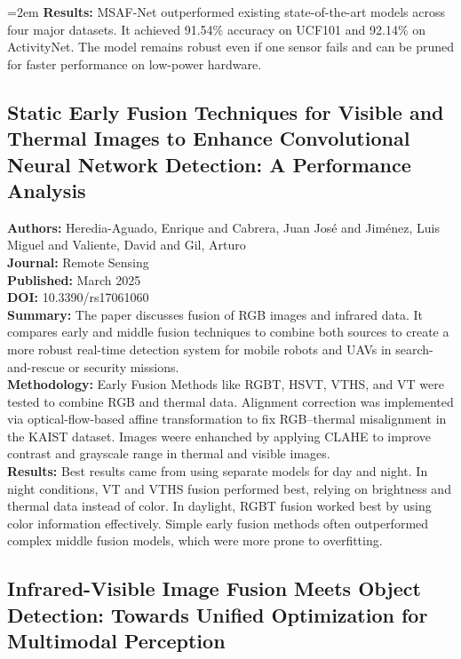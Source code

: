 \begingroup\emergencystretch=2em
  \textbf{Results:} MSAF-Net outperformed existing state-of-the-art models across four major
  datasets. It achieved 91.54\% accuracy on UCF101 and 92.14\% on ActivityNet. The model remains
  robust even if one sensor fails and can be pruned for faster performance on low-power hardware.
\par\endgroup

\subsection{Static Early Fusion Techniques for Visible and Thermal Images to Enhance Convolutional
  Neural Network Detection: A Performance Analysis}
\textbf{Authors:} Heredia-Aguado, Enrique and Cabrera, Juan José and Jiménez, Luis Miguel and
Valiente, David and Gil, Arturo \\
\textbf{Journal:} Remote Sensing \\
\textbf{Published:} March 2025 \\
\textbf{DOI:} 10.3390/rs17061060 \\

\textbf{Summary:} The paper discusses fusion of RGB images and infrared data. It compares early and
middle fusion techniques to combine both sources to create a more robust real-time detection system
for mobile robots and UAVs in search-and-rescue or security missions. \\

\textbf{Methodology:} Early Fusion Methods like RGBT, HSVT, VTHS, and VT were tested to combine RGB
and thermal data. Alignment correction was implemented via optical-flow-based affine transformation
to fix RGB–thermal misalignment in the KAIST dataset. Images weere enhanched by applying CLAHE to
improve contrast and grayscale range in thermal and visible images. \\

\textbf{Results:} Best results came from using separate models for day and night. In night
conditions, VT and VTHS fusion performed best, relying on brightness and thermal data instead of
color. In daylight, RGBT fusion worked best by using color information effectively. Simple early
fusion methods often outperformed complex middle fusion models, which were more prone to
overfitting.

\subsection{Infrared-Visible Image Fusion Meets Object Detection: Towards Unified Optimization for
  Multimodal Perception}

